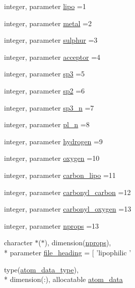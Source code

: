 \begin{DoxyCompactItemize}
\item 
integer, parameter \hyperlink{classcalc__chemscore_aff9edea104beefd190c34dc9fd12a9b3}{lipo} =1
\item 
integer, parameter \hyperlink{classcalc__chemscore_a9e666817bc6f8db23e5265e8192ffe0d}{metal} =2
\item 
integer, parameter \hyperlink{classcalc__chemscore_a95d7b76641cfc63037276718a6c0d409}{sulphur} =3
\item 
integer, parameter \hyperlink{classcalc__chemscore_ab0714dffb0d2349340f52b46a349c063}{acceptor} =4
\item 
integer, parameter \hyperlink{classcalc__chemscore_ad73876c67ee54139a1c99297d4393db4}{sp3} =5
\item 
integer, parameter \hyperlink{classcalc__chemscore_af5cc74079916deed8dc10fc9749a5ae2}{sp2} =6
\item 
integer, parameter \hyperlink{classcalc__chemscore_a09ae8a1f9f2ef13e71fcec99d065126d}{sp3\-\_\-n} =7
\item 
integer, parameter \hyperlink{classcalc__chemscore_a67e8e7ef0865731aa0ac9ca31aa4e52d}{pl\-\_\-n} =8
\item 
integer, parameter \hyperlink{classcalc__chemscore_a828a4eeea12cf549672d73ad8c68c6c5}{hydrogen} =9
\item 
integer, parameter \hyperlink{classcalc__chemscore_aee2123f93427e62198b19acbe63a1a01}{oxygen} =10
\item 
integer, parameter \hyperlink{classcalc__chemscore_a24ac03a6e52902f5474d7bf0636d1b8d}{carbon\-\_\-lipo} =11
\item 
integer, parameter \hyperlink{classcalc__chemscore_af75eb4e985bdc19e748fddbce9488d0e}{carbonyl\-\_\-carbon} =12
\item 
integer, parameter \hyperlink{classcalc__chemscore_a9da5d81c112c26d8c8911ad5c100be1b}{carbonyl\-\_\-oxygen} =13
\item 
integer, parameter \hyperlink{classcalc__chemscore_a21d027f3f912e3305b65b0db008c5053}{nprops} =13
\item 
character $\ast$($\ast$), dimension(\hyperlink{classcalc__chemscore_a21d027f3f912e3305b65b0db008c5053}{nprops}), \\*
parameter \hyperlink{classcalc__chemscore_a7e04d3fd8fe18efe87ef287cc54572dd}{file\-\_\-heading} = \mbox{[} 'lipophilic '
\item 
type(\hyperlink{structcalc__chemscore_1_1atom__data__type}{atom\-\_\-data\-\_\-type}), \\*
dimension(\-:), allocatable \hyperlink{classcalc__chemscore_a4de84d0dd19f0b32599251fb0812813c}{atom\-\_\-data}

\end{DoxyCompactItemize}
